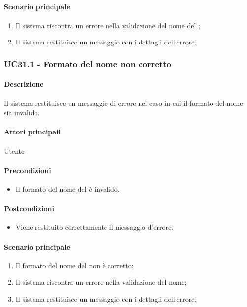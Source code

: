 \paragraph*{Scenario principale}
\begin{enumerate}
  \item Il sistema riscontra un errore nella validazione del nome del ;
  \item Il sistema restituisce un messaggio con i dettagli dell'errore.  
\end{enumerate}


\subsubsection{UC31.1 - Formato del nome non corretto}\label{UC31point1}
\paragraph*{Descrizione}
Il sistema restituisce un messaggio di errore nel caso in cui il formato del nome sia invalido.

\paragraph*{Attori principali}
Utente

\paragraph*{Precondizioni}
\begin{itemize}
  \item Il formato del nome del  è invalido.
\end{itemize}

\paragraph*{Postcondizioni}
\begin{itemize}
  \item Viene restituito correttamente il messaggio d'errore.
\end{itemize}

\paragraph*{Scenario principale}
\begin{enumerate}
  \item Il formato del nome del  non è corretto;
  \item Il sistema riscontra un errore nella validazione del nome;
  \item Il sistema restituisce un messaggio con i dettagli dell'errore.  
\end{enumerate}

